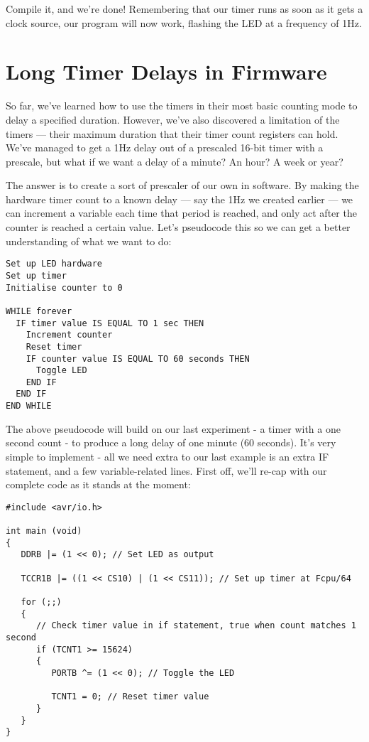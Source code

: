 \documentclass[a4paper,oneside,notitlepage]{book}
\begin{document}
Compile it, and we're done! Remembering that our timer runs as soon as it gets a clock source, our program will now work, flashing the LED at a frequency of 1Hz.

\label{chp:LongFWDelays}
\chapter{Long Timer Delays in Firmware}

So far, we've learned how to use the timers in their most basic counting mode to delay a specified duration. However, we've also discovered a limitation of the timers --- their maximum duration that their timer count registers can hold. We've managed to get a 1Hz delay out of a prescaled 16-bit timer with a prescale, but what if we want a delay of a minute? An hour? A week or year?

The answer is to create a sort of prescaler of our own in software. By making the hardware timer count to a known delay --- say the 1Hz we created earlier --- we can increment a variable each time that period is reached, and only act after the counter is reached a certain value. Let's pseudocode this so we can get a better understanding of what we want to do: 

\begin{center}
\begin{lstlisting}[keywordstyle=\color{black},commentstyle=\color{black}]
Set up LED hardware
Set up timer
Initialise counter to 0

WHILE forever
  IF timer value IS EQUAL TO 1 sec THEN
    Increment counter
    Reset timer
    IF counter value IS EQUAL TO 60 seconds THEN
      Toggle LED
    END IF
  END IF
END WHILE
\end{lstlisting}
\end{center}

The above pseudocode will build on our last experiment - a timer with a one second count - to produce a long delay of one minute (60 seconds). It's very simple to implement - all we need extra to our last example is an extra IF statement, and a few variable-related lines. First off, we'll re-cap with our complete code as it stands at the moment:

\begin{center}
\begin{lstlisting}
#include <avr/io.h>

int main (void)
{
   DDRB |= (1 << 0); // Set LED as output

   TCCR1B |= ((1 << CS10) | (1 << CS11)); // Set up timer at Fcpu/64

   for (;;)
   {
      // Check timer value in if statement, true when count matches 1 second
      if (TCNT1 >= 15624)
      {
         PORTB ^= (1 << 0); // Toggle the LED

         TCNT1 = 0; // Reset timer value
      }
   }
} 
\end{lstlisting}
\end{center}
\end{document}
